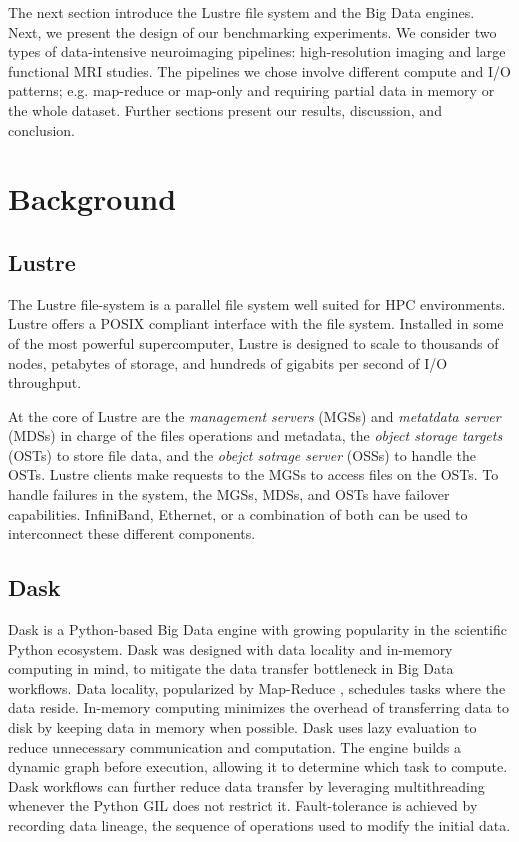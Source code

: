 \documentclass[conference]{IEEEtran}
\begin{document}
The next section introduce the Lustre file system and the Big Data engines.
Next, we present the design of our benchmarking experiments.
We consider two types of data-intensive neuroimaging pipelines: high-resolution imaging and large functional MRI studies.
The pipelines we chose involve different compute and I/O patterns; e.g. map-reduce or map-only and requiring partial data in memory or the whole dataset.
Further sections present our results, discussion, and conclusion.


\section{Background}
\subsection{Lustre}
The Lustre file-system is a parallel file system well suited for HPC environments.
Lustre offers a POSIX compliant interface with the file system.
Installed in some of the most powerful supercomputer, Lustre is designed to scale to thousands of nodes, petabytes of storage, and hundreds of gigabits per second of I/O throughput.

At the core of Lustre are the \textit{management servers} (MGSs) and \textit{metatdata server} (MDSs) in charge of the files operations and metadata,
the \textit{object storage targets} (OSTs) to store file data, and the \textit{obejct sotrage server} (OSSs) to handle the OSTs.
Lustre clients make requests to the MGSs to access files on the OSTs.
To handle failures in the system, the MGSs, MDSs, and OSTs have failover capabilities.
InfiniBand, Ethernet, or a combination of both can be used to interconnect these different components.

\subsection{Dask}
Dask is a Python-based Big Data engine with growing popularity in the scientific Python ecosystem.
Dask was designed with data locality and in-memory computing in mind, to mitigate the data transfer bottleneck in Big Data workflows.
Data locality, popularized by Map-Reduce \cite{dean2008mapreduce}, schedules tasks where the data reside.
In-memory computing minimizes the overhead of transferring data to disk by keeping data in memory when possible.
Dask uses lazy evaluation to reduce unnecessary communication and computation.
The engine builds a dynamic graph before execution, allowing it to determine which task to compute.
Dask workflows can further reduce data transfer by leveraging multithreading whenever the Python GIL does not restrict it.
Fault-tolerance is achieved by recording data lineage, the sequence of operations used to modify the initial data.
\end{document}
